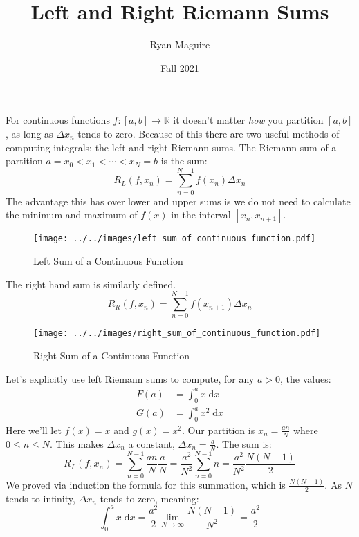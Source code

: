 \documentclass{article}
\title{Left and Right Riemann Sums}
\author{Ryan Maguire}
\date{Fall 2021}
\theoremstyle{normal}
\theoremstyle{plain}
\begin{document}
    \maketitle
    For continuous functions $f:[a,b]\rightarrow\mathbb{R}$ it doesn't matter
    \textit{how} you partition $[a,b]$, as long as $\Delta{x}_{n}$ tends to
    zero. Because of this there are two useful methods of computing integrals:
    the left and right Riemann sums. The Riemann sum of a partition
    $a=x_{0}<x_{1}<\cdots<x_{N}=b$ is the sum:
    \begin{equation}
        R_{L}(f,x_{n})=\sum_{n=0}^{N-1}f(x_{n})\Delta{x}_{n}
    \end{equation}
    The advantage this has over lower and upper sums is we do not need to
    calculate the minimum and maximum of $f(x)$ in the interval
    $[x_{n},x_{n+1}]$.
    \begin{figure}[H]
        \centering
        \texttt{[image: ../../images/left\_sum\_of\_continuous\_function.pdf]}
        \caption{Left Sum of a Continuous Function}
    \end{figure}
    The right hand sum is similarly defined.
    \begin{equation}
        R_{R}(f,x_{n})=\sum_{n=0}^{N-1}f(x_{n+1})\Delta{x}_{n}
    \end{equation}
    \begin{figure}[H]
        \centering
        \texttt{[image: ../../images/right\_sum\_of\_continuous\_function.pdf]}
        \caption{Right Sum of a Continuous Function}
    \end{figure}
    Let's explicitly use left Riemann sums to compute, for any $a>0$, the
    values:
    \begin{align}
        F(a)&=\int_{0}^{a}x\;\textrm{d}x\\
        G(a)&=\int_{0}^{a}x^{2}\;\textrm{d}x
    \end{align}
    Here we'll let $f(x)=x$ and $g(x)=x^{2}$.
    Our partition is $x_{n}=\frac{an}{N}$ where $0\leq{n}\leq{N}$. This makes
    $\Delta{x}_{n}$ a constant, $\Delta{x}_{n}=\frac{a}{N}$. The sum is:
    \begin{equation}
        R_{L}(f,x_{n})=\sum_{n=0}^{N-1}\frac{an}{N}\frac{a}{N}
            =\frac{a^{2}}{N^{2}}\sum_{n=0}^{N-1}n
            =\frac{a^{2}}{N^{2}}\frac{N(N-1)}{2}
    \end{equation}
    We proved via induction the formula for this summation, which is
    $\frac{N(N-1)}{2}$. As $N$ tends to infinity, $\Delta{x}_{n}$ tends to zero,
    meaning:
    \begin{equation}
        \int_{0}^{a}x\;\textrm{d}x
            =\frac{a^{2}}{2}\lim_{N\rightarrow\infty}\frac{N(N-1)}{N^{2}}
            =\frac{a^{2}}{2}
    \end{equation}
\end{document}
